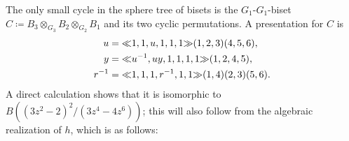 \documentclass{amsart}
\begin{document}
The only small cycle in the sphere tree of bisets is the $G_1$-$G_1$-biset
$C\coloneqq B_3\otimes_{G_3}B_2\otimes_{G_2}B_1$ and its two cyclic
permutations. A presentation for $C$ is
\begin{align*}
  u&={\ll}1,1,u,1,1,1{\gg}(1,2,3)(4,5,6),\\
  y&={\ll}u^{-1},u y,1,1,1,1{\gg}(1,2,4,5),\\
  r^{-1}&={\ll}1,1,1,r^{-1},1,1{\gg}(1,4)(2,3)(5,6).
\end{align*}
A direct calculation shows that it is isomorphic to
$B((3z^2-2)^2/(3z^4-4z^6))$; this will also follow from the algebraic
realization of $h$, which is as follows:
\begin{center}
\end{center}
\end{document}
